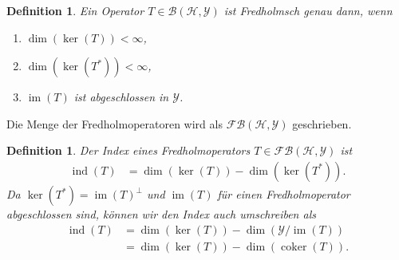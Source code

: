 \documentclass[11pt, hidelinks]{article}
\newcommand{\h}{\mathcal{H}}
\newcommand{\ind}{\operatorname{ind}}
\newcommand{\im}{\operatorname{im}}
\newcommand{\coker}{\operatorname{coker}}
\numberwithin{conj}{section}
\newtheorem{definition}[conj]{Definition}
\begin{document}
\begin{definition}
    Ein Operator $T \in \mathcal{B}(\h,\mathcal{Y})$ ist Fredholmsch genau dann, wenn
    \begin{enumerate}
        \item $\dim(\ker(T)) < \infty$,
        \item $\dim(\ker(T^\ast)) < \infty$,
        \item $\im(T)$ ist abgeschlossen in $\mathcal{Y}$.
    \end{enumerate}
\end{definition}

Die Menge der Fredholmoperatoren wird als $\mathcal{FB}(\h,\mathcal{Y})$ geschrieben.

\begin{definition}
    Der Index eines Fredholmoperators $T \in \mathcal{FB}(\h,\mathcal{Y})$ ist
    \begin{align}
        \ind(T) &= \dim(\ker(T)) - \dim(\ker(T^\ast)).
    \end{align}
    Da $\ker(T^\ast) = \im(T)^\perp$ und $\im(T)$ für einen Fredholmoperator abgeschlossen sind, können wir den Index auch umschreiben als
    \begin{align}
        \ind(T) &= \dim(\ker(T)) - \dim(\mathcal{Y}/\im(T)) \nonumber\\
                &= \dim(\ker(T)) - \dim(\coker(T)).
    \end{align}
\end{definition}
\end{document}
